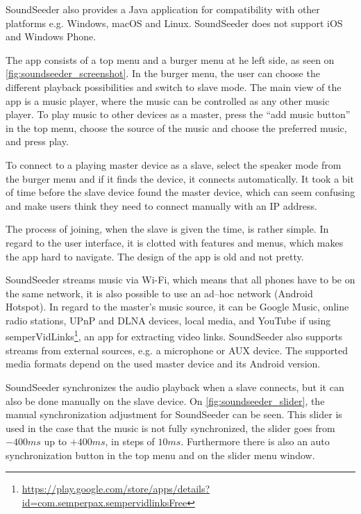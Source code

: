 SoundSeeder also provides a Java application for compatibility with other platforms e.g. Windows, macOS and Linux.
SoundSeeder does not support iOS and Windows Phone\cite{soundseeder_ios}.

The app consists of a top menu and a burger menu at he left side, as seen on \cref{fig:soundseeder_screenshot}.
In the burger menu, the user can choose the different playback possibilities and switch to slave mode.
The main view of the app is a music player, where the music can be controlled as any other music player. 
To play music to other devices as a master, press the ``add music button'' in the top menu,
choose the source of the music and choose the preferred music, and press play. 

To connect to a playing master device as a slave, select the speaker mode from the burger menu and if it finds the device, it connects automatically.
It took a bit of time before the slave device found the master device, which can seem confusing and make users think they need to connect manually with an IP address. 

The process of joining, when the slave is given the time, is rather simple.
In regard to the user interface, it is clotted with features and menus, which makes the app hard to navigate.
The design of the app is old and not pretty.

SoundSeeder streams music via Wi-Fi, 
which means that all phones have to be on the same network\cite{soundseether_faq}, it is also possible to use an ad--hoc network (Android Hotspot).
In regard to the master's music source, it can be Google Music, online radio stations, UPnP and DLNA devices, local media, and YouTube if using semperVidLinks\footnote{\url{https://play.google.com/store/apps/details?id=com.semperpax.sempervidlinksFree}}, an app for extracting video links.
SoundSeeder also supports streams from external sources, e.g. a microphone or AUX device. 
The supported media formats depend on the used master device and its Android version.\cite{soundseether_faq}

SoundSeeder synchronizes the audio playback when a slave connects, but it can also be done manually on the slave device. 
On \cref{fig:soundseeder_slider}, the manual synchronization adjustment for SoundSeeder can be seen.
This slider is used in the case that the music is not fully synchronized, the slider goes from $-400 ms$ up to $+400 ms$, in steps of $10 ms$.
Furthermore there is also an auto synchronization button in the top menu and on the slider menu window. 

